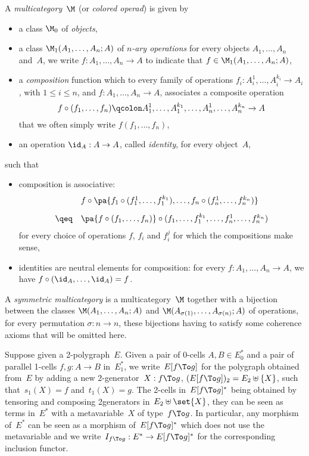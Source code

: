 \documentclass{LMCS}
\renewcommand{\leq}{\leqslant}
\newenvironment{definition}{\begin{defi}}{\end{defi}}
\begin{document}
\begin{definition}
  \label{def:multicat}
  A \emph{multicategory}~$\M$ (or \emph{colored operad}) is given by
  \begin{itemize}
  \item a class $\M_0$ of \emph{objects},
  \item a class $\M_1(A_1,\ldots,A_n;A)$ of \emph{$n$-ary operations} for every
    objects $A_1,\ldots,A_n$ and~$A$, we write $f:A_1,\ldots,A_n\to A$ to
    indicate that $f\in\M_1(A_1,\ldots,A_n;A)$,
  \item a \emph{composition} function which to every family of operations
    $f_i:A_i^1,\ldots,A_i^{k_i}\to A_i$, with \hbox{$1\leq i\leq n$}, and
    $f:A_1,\ldots,A_n\to A$, associates a composite operation
    \[
    f\circ(f_1,\ldots,f_n)
    \qcolon
    A_1^1,\ldots,A_1^{k_1},\ldots,A_n^1,\ldots,A_n^{k_n}\to A
    \]
    that we often simply write $f(f_1,\ldots,f_n)$,
  \item an operation $\id_A:A\to A$, called \emph{identity}, for every object~$A$,
  \end{itemize}
  such that
  \begin{itemize}
  \item composition is associative:
    \[
    \begin{array}{cl}
      &f\circ\pa{f_1\circ(f_1^1,\ldots,f_1^{k_1}),\ldots,f_n\circ(f_n^1,\ldots,f_n^{k_n})}\\[2ex]
      \qeq&
      \pa{f\circ(f_1,\ldots,f_n)}\circ(f_1,\ldots,f_1^{k_1},\ldots,f_n^1,\ldots,f_n^{k_n})

    \end{array}
    \]
    for every choice of operations $f$, $f_i$ and $f_i^j$ for which the
    compositions make sense,
  \item identities are neutral elements for composition: for every
    \hbox{$f:A_1,\ldots,A_n\to A$}, we have $f\circ(\id_A,\ldots,\id_A)=f$.
  \end{itemize}
  A \emph{symmetric multicategory} is a multicategory~$\M$ together with a
  bijection between the classes $\M(A_1,\ldots,A_n;A)$ and
  $\M(A_{\sigma(1)},\ldots,A_{\sigma(n)};A)$ of operations, for every
  permutation \hbox{$\sigma:n\to n$}, these bijections having to satisfy some
  coherence axioms that will be omitted here.
\end{definition}

Suppose given a 2-polygraph~$E$. Given a pair of 0-cells $A,B\in E_0^*$ and a
pair of parallel 1-cells $f,g:A\to B$ in~$E_1^*$, we write~$E[f\To g]$ for the
polygraph obtained from~$E$ by adding a new 2-generator~$X:f\To g$, \ie $(E[f\To
g])_2=E_2\uplus\{X\}$, such that~$s_1(X)=f$ and~$t_1(X)=g$. The 2-cells
in~$E[f\To g]^*$ being obtained by tensoring and composing 2\nbd{}generators
in~$E_2\uplus\set{X}$, they can be seen as terms in~$E^*$ with a
metavariable~$X$ of type~$f\To g$. In particular, any morphism of~$E^*$ can be
seen as a morphism of~$E[f\To g]^*$ which does not use the metavariable and we
write~$I_{f\To g}:E^*\to E[f\To g]^*$ for the corresponding inclusion functor.
\end{document}
